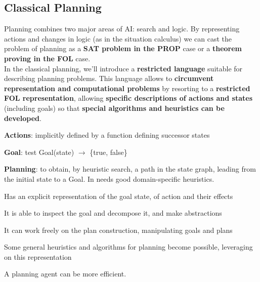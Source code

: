 \documentclass[10pt]{report}
\begin{document}
\subsection{Classical Planning}
Planning combines two major areas of AI: search and logic. By representing actions and changes in logic (as in the situation calculus) we can cast the problem of planning as a \textbf{SAT problem in the PROP} case or a \textbf{theorem proving in the FOL} case.\\
In the classical planning, we'll introduce a \textbf{restricted language} suitable for describing planning problems. This language allows to \textbf{circumvent representation and computational problems} by resorting to a \textbf{restricted FOL representation}, allowing \textbf{specific descriptions of actions and states} (including goals) so that \textbf{special algorithms and heuristics can be developed}.
\begin{multicols}{2}
\begin{list}{}{\textbf{Problem Solving Agent}}
	\item \textbf{Actions}: implicitly defined by a function defining successor states
	\item \textbf{Goal}: test Goal(state) $\rightarrow$ \{true, false\}
	\item \textbf{Planning}: to obtain, by heuristic search, a path in the state graph, leading from the initial state to a Goal. In needs good domain-specific heuristics.
\end{list}
\columnbreak
\begin{list}{}{\textbf{Planning Agent}}
	\item Has an explicit representation of the goal state, of action and their effects
	\item It is able to inspect the goal and decompose it, and make abstractions
	\item It can work freely on the plan construction, manipulating goals and plans
	\item Some general heuristics and algorithms for planning become possible, leveraging on this representation
\end{list}
A planning agent can be more efficient.
\end{multicols}
\end{document}
